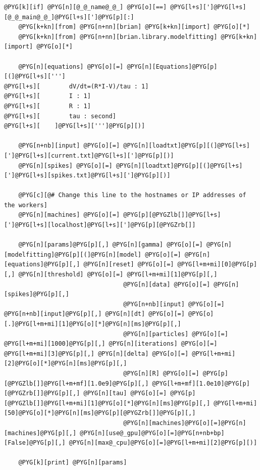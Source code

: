 \documentclass[letterpaper,10pt,english]{manual}
\begin{document}
\begin{Verbatim}[commandchars=@\[\]]
@PYG[k][if] @PYG[n][@_@_name@_@_] @PYG[o][==] @PYG[l+s][']@PYG[l+s][@_@_main@_@_]@PYG[l+s][']@PYG[p][:]
    @PYG[k+kn][from] @PYG[n+nn][brian] @PYG[k+kn][import] @PYG[o][*]
    @PYG[k+kn][from] @PYG[n+nn][brian.library.modelfitting] @PYG[k+kn][import] @PYG[o][*]

    @PYG[n][equations] @PYG[o][=] @PYG[n][Equations]@PYG[p][(]@PYG[l+s][''']
@PYG[l+s][        dV/dt=(R*I-V)/tau : 1]
@PYG[l+s][        I : 1]
@PYG[l+s][        R : 1]
@PYG[l+s][        tau : second]
@PYG[l+s][    ]@PYG[l+s][''']@PYG[p][)]

    @PYG[n+nb][input] @PYG[o][=] @PYG[n][loadtxt]@PYG[p][(]@PYG[l+s][']@PYG[l+s][current.txt]@PYG[l+s][']@PYG[p][)]
    @PYG[n][spikes] @PYG[o][=] @PYG[n][loadtxt]@PYG[p][(]@PYG[l+s][']@PYG[l+s][spikes.txt]@PYG[l+s][']@PYG[p][)]

    @PYG[c][@# Change this line to the hostnames or IP addresses of the workers]
    @PYG[n][machines] @PYG[o][=] @PYG[p][@PYGZlb[]]@PYG[l+s][']@PYG[l+s][localhost]@PYG[l+s][']@PYG[p][@PYGZrb[]]

    @PYG[n][params]@PYG[p][,] @PYG[n][gamma] @PYG[o][=] @PYG[n][modelfitting]@PYG[p][(]@PYG[n][model] @PYG[o][=] @PYG[n][equations]@PYG[p][,] @PYG[n][reset] @PYG[o][=] @PYG[l+m+mi][0]@PYG[p][,] @PYG[n][threshold] @PYG[o][=] @PYG[l+m+mi][1]@PYG[p][,]
                                 @PYG[n][data] @PYG[o][=] @PYG[n][spikes]@PYG[p][,]
                                 @PYG[n+nb][input] @PYG[o][=] @PYG[n+nb][input]@PYG[p][,] @PYG[n][dt] @PYG[o][=] @PYG[o][.]@PYG[l+m+mi][1]@PYG[o][*]@PYG[n][ms]@PYG[p][,]
                                 @PYG[n][particles] @PYG[o][=] @PYG[l+m+mi][1000]@PYG[p][,] @PYG[n][iterations] @PYG[o][=] @PYG[l+m+mi][3]@PYG[p][,] @PYG[n][delta] @PYG[o][=] @PYG[l+m+mi][2]@PYG[o][*]@PYG[n][ms]@PYG[p][,]
                                 @PYG[n][R] @PYG[o][=] @PYG[p][@PYGZlb[]]@PYG[l+m+mf][1.0e9]@PYG[p][,] @PYG[l+m+mf][1.0e10]@PYG[p][@PYGZrb[]]@PYG[p][,] @PYG[n][tau] @PYG[o][=] @PYG[p][@PYGZlb[]]@PYG[l+m+mi][1]@PYG[o][*]@PYG[n][ms]@PYG[p][,] @PYG[l+m+mi][50]@PYG[o][*]@PYG[n][ms]@PYG[p][@PYGZrb[]]@PYG[p][,]
                                 @PYG[n][machines]@PYG[o][=]@PYG[n][machines]@PYG[p][,] @PYG[n][use@_gpu]@PYG[o][=]@PYG[n+nb+bp][False]@PYG[p][,] @PYG[n][max@_cpu]@PYG[o][=]@PYG[l+m+mi][2]@PYG[p][)]

    @PYG[k][print] @PYG[n][params]
\end{Verbatim}

\resetcurrentobjects
\hypertarget{--doc-examples-modelfitting_clusterexample_worker}{}
\end{document}
